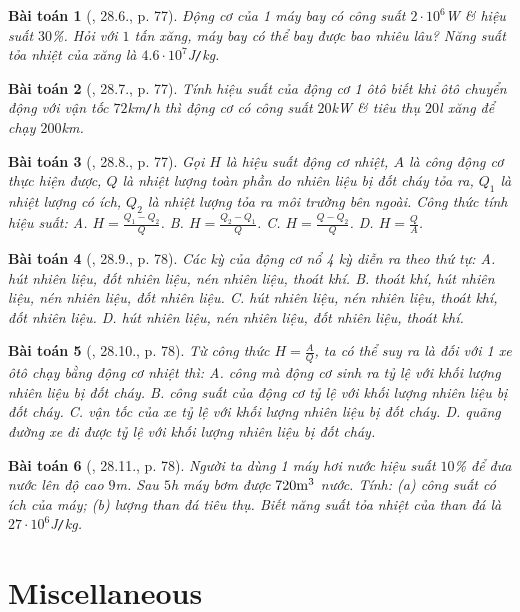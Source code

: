 \documentclass{article}
\newtheorem{baitoan}{Bài toán}
\begin{document}
\begin{baitoan}[\cite{SBT_Vat_Ly_8}, 28.6., p. 77]
	Động cơ của 1 máy bay có công suất $2\cdot10^6$\emph{W} \& hiệu suất $30$\%. Hỏi với $1$ tấn xăng, máy bay có thể bay được bao nhiêu lâu? Năng suất tỏa nhiệt của xăng là $4.6\cdot10^7$\emph{J\texttt{/}kg}.
\end{baitoan}

\begin{baitoan}[\cite{SBT_Vat_Ly_8}, 28.7., p. 77]
	Tính hiệu suất của động cơ 1 ôtô biết khi ôtô chuyển động với vận tốc $72$\emph{km\texttt{/}h} thì động cơ có công suất $20$\emph{kW} \& tiêu thụ $20$\emph{l} xăng để chạy $200$\emph{km}.
\end{baitoan}

\begin{baitoan}[\cite{SBT_Vat_Ly_8}, 28.8., p. 77]
	Gọi $H$ là hiệu suất động cơ nhiệt, $A$ là công động cơ thực hiện được, $Q$ là nhiệt lượng toàn phần do nhiên liệu bị đốt cháy tỏa ra, $Q_1$ là nhiệt lượng có ích, $Q_2$ là nhiệt lượng tỏa ra môi trường bên ngoài. Công thức tính hiệu suất: {\sf A.} $H = \frac{Q_1 - Q_2}{Q}$. {\sf B.} $H = \frac{Q_2 - Q_1}{Q}$. {\sf C.} $H = \frac{Q - Q_2}{Q}$. {\sf D.} $H = \frac{Q}{A}$. 
\end{baitoan}

\begin{baitoan}[\cite{SBT_Vat_Ly_8}, 28.9., p. 78]
	Các kỳ của động cơ nổ 4 kỳ diễn ra theo thứ tự: {\sf A.} hút nhiên liệu, đốt nhiên liệu, nén nhiên liệu, thoát khí. {\sf B.} thoát khí, hút nhiên liệu, nén nhiên liệu, đốt nhiên liệu. {\sf C.} hút nhiên liệu, nén nhiên liệu, thoát khí, đốt nhiên liệu. {\sf D.} hút nhiên liệu, nén nhiên liệu, đốt nhiên liệu, thoát khí.
\end{baitoan}

\begin{baitoan}[\cite{SBT_Vat_Ly_8}, 28.10., p. 78]
	Từ công thức $H = \frac{A}{Q}$, ta có thể suy ra là đối với 1 xe ôtô chạy bằng động cơ nhiệt thì: {\sf A.} công mà động cơ sinh ra tỷ lệ với khối lượng nhiên liệu bị đốt cháy. {\sf B.} công suất của động cơ tỷ lệ với khối lượng nhiên liệu bị đốt cháy. {\sf C.} vận tốc của xe tỷ lệ với khối lượng nhiên liệu bị đốt cháy. {\sf D.} quãng đường xe đi được tỷ lệ với khối lượng nhiên liệu bị đốt cháy.
\end{baitoan}

\begin{baitoan}[\cite{SBT_Vat_Ly_8}, 28.11., p. 78]
	Người ta dùng 1 máy hơi nước hiệu suất $10$\% để đưa nước lên độ cao $9$\emph{m}. Sau $5$\emph{h} máy bơm được $720\rm m^3$ nước. Tính: (a) công suất có ích của máy; (b) lượng than đá tiêu thụ. Biết năng suất tỏa nhiệt của than đá là $27\cdot10^6$\emph{J\texttt{/}kg}.
\end{baitoan}


\section{Miscellaneous}


\printbibliography[heading=bibintoc]
	
\end{document}
